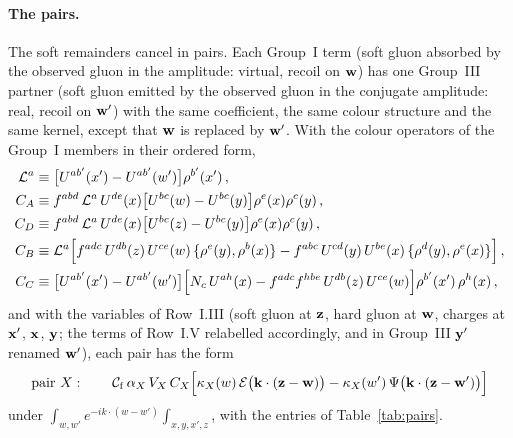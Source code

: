 \paragraph{The pairs.} The soft remainders cancel in pairs. Each Group~I term (soft gluon absorbed by the observed gluon in the amplitude: virtual, recoil on $\mathbf{w}$) has one Group~III partner (soft gluon emitted by the observed gluon in the conjugate amplitude: real, recoil on $\mathbf{w}'$) with the same coefficient, the same colour structure and the same kernel, except that $\mathbf{w}$ is replaced by $\mathbf{w}'$. With the colour operators of the Group~I members in their ordered form,
\begin{align}\label{eq:CABCD}
\mathcal L^a&\equiv\big[U^{ab'}(x')-U^{ab'}(w')\big]\rho^{b'}(x')\,,\notag\\
C_A&\equiv f^{abd}\,\mathcal L^a\,U^{de}(x)\big[U^{bc}(w)-U^{bc}(y)\big]\rho^e(x)\rho^c(y)\,,\notag\\
C_D&\equiv f^{abd}\,\mathcal L^a\,U^{de}(x)\big[U^{bc}(z)-U^{bc}(y)\big]\rho^e(x)\rho^c(y)\,,\notag\\
C_B&\equiv\mathcal L^a\Big[f^{adc}\,U^{db}(z)\,U^{ce}(w)\,\{\rho^e(y),\rho^b(x)\}-f^{abc}\,U^{cd}(y)\,U^{be}(x)\,\{\rho^d(y),\rho^e(x)\}\Big]\,,\notag\\
C_C&\equiv\big[U^{ab'}(x')-U^{ab'}(w')\big]\Big[N_c\,U^{ah}(x)-f^{adc}f^{hbe}\,U^{db}(z)\,U^{ce}(w)\Big]\rho^{b'}(x')\,\rho^h(x)\,,
\end{align}
and with the variables of Row~I.III (soft gluon at $\mathbf{z}$, hard gluon at $\mathbf{w}$, charges at $\mathbf{x}'$, $\mathbf{x}$, $\mathbf{y}$; the terms of Row~I.V relabelled accordingly, and in Group~III $\mathbf{y}'$ renamed $\mathbf{w}'$), each pair has the form
\begin{align}\label{eq:pair}
\text{pair }X:\qquad\mathcal C_{\rm f}\,\alpha_X\,V_X\,C_X\Big[\kappa_X(w)\,\mathcal E\big(\mathbf{k}\cdot(\mathbf{z}-\mathbf{w})\big)-\kappa_X(w')\,\Psi\big(\mathbf{k}\cdot(\mathbf{z}-\mathbf{w}')\big)\Big]
\end{align}
under $\int_{w,w'}e^{-ik\cdot(w-w')}\int_{x,y,x',z}$, with the entries of Table~\ref{tab:pairs}.
